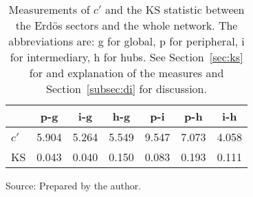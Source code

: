 \begin{table}[h!]
\begin{center}
\caption{Measurements of $c'$ and the KS statistic between the Erd\"os sectors and the whole network. The abbreviations are: g for global, p for peripheral, i for intermediary, h for hubs. See Section~\ref{sec:ks} for and explanation of the measures and Section~\ref{subsec:di} for discussion.}
\begin{tabular}{| l || c | c | c | c | c | c |}\hline
{\bf } & {\bf p-g} & {\bf i-g} & {\bf h-g} & {\bf p-i} & {\bf p-h} & {\bf i-h} \\\hline\hline
$c'$ & 5.904  & 5.264  & 5.549  & 9.547  & 7.073  & 4.058 \\
KS & 0.043  & 0.040  & 0.150  & 0.083  & 0.193  & 0.111 \\\hline
\end{tabular}
\begin{flushleft}
Source: Prepared by the author.\
\end{flushleft}
\end{center}
\end{table}
